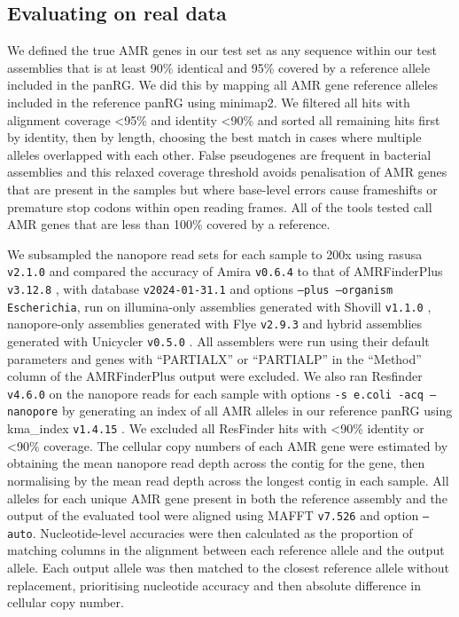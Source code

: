 \subsection*{Evaluating on real data}

We defined the true AMR genes in our test set as any sequence within our test assemblies that is at least 90\% identical and 95\% covered by a reference allele included in the panRG. We did this by mapping all AMR gene reference alleles included in the reference panRG using minimap2. We filtered all hits with alignment coverage <95\% and identity <90\% and sorted all remaining hits first by identity, then by length, choosing the best match in cases where multiple alleles overlapped with each other. False pseudogenes are frequent in bacterial assemblies and this relaxed coverage threshold avoids penalisation of AMR genes that are present in the samples but where base-level errors cause frameshifts or premature stop codons within open reading frames. All of the tools tested call AMR genes that are less than 100\% covered by a reference. 

We subsampled the nanopore read sets for each sample to 200x using rasusa \texttt{v2.1.0} \cite{Hall2022}  and compared the accuracy of Amira \texttt{v0.6.4} to that of AMRFinderPlus \texttt{v3.12.8} \cite{Feldgarden2021}, with database \texttt{v2024-01-31.1} and options \texttt{--plus --organism Escherichia}, run on illumina-only assemblies generated with Shovill \texttt{v1.1.0} \cite{Shovill, Bankevich2012}, nanopore-only assemblies generated with Flye \texttt{v2.9.3} \cite{Kolmogorov2019} and hybrid assemblies generated with Unicycler \texttt{v0.5.0} \cite{Wick2017}. All assemblers were run using their default parameters and genes with “PARTIALX” or “PARTIALP” in the “Method” column of the AMRFinderPlus output were excluded. We also ran Resfinder \cite{Bortolaia2020} \texttt{v4.6.0} on the nanopore reads for each sample with options \texttt{-s e.coli -acq --nanopore} by generating an index of all AMR alleles in our reference panRG using kma\_index \texttt{v1.4.15} \cite{Clausen2018}. We excluded all ResFinder hits with <90\% identity or <90\% coverage. The cellular copy numbers of each AMR gene were estimated by obtaining the mean nanopore read depth across the contig for the gene, then normalising by the mean read depth across the longest contig in each sample. All alleles for each unique AMR gene present in both the reference assembly and the output of the evaluated tool were aligned using MAFFT \texttt{v7.526} \cite{mafft} and option \texttt{–auto}. Nucleotide-level accuracies were then calculated as the proportion of matching columns in the alignment between each reference allele and the output allele. Each output allele was then matched to the closest reference allele without replacement, prioritising nucleotide accuracy and then absolute difference in cellular copy number. 


